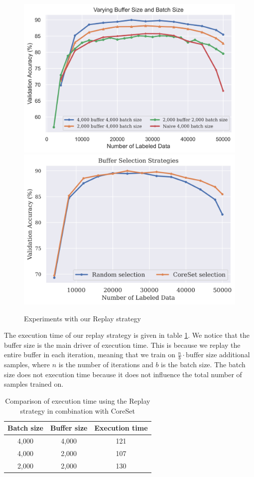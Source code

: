 \begin{figure}[h]
    \centering
    \includegraphics[width=0.45\linewidth]{images/results_CAL/replay_varying_batch_size.png} \hfill
    \includegraphics[width=0.45\linewidth]{images/results_CAL/replay_buffer_selection.png}
    \caption{Experiments with our Replay strategy}
    \label{fig:Evaluation:CAL:Replay}
\end{figure}

The execution time of our replay strategy is given in table \ref{fig:Evaluation:CAL:Replay_Time}. We notice that the buffer size is the main driver of execution time. This is because
we replay the entire buffer in each iteration, meaning that we train on $\frac{n}{b} \cdot \text{buffer size}$ additional samples, where $n$ is the number of iterations and $b$ is
the batch size. The batch size does not execution time because it does not influence the total number of samples trained on. \par

\begin{table}[h]
    \centering
    \begin{tabular}{c | c  c} 
        Batch size & Buffer size & Execution time\\ 
        \hline 
        4,000 & 4,000 & 121 \\
        4,000 & 2,000 & 107 \\
        2,000 & 2,000 & 130 \\
    \end{tabular}
    \caption{Comparison of execution time using the Replay strategy in combination with CoreSet}
    \label{fig:Evaluation:CAL:Replay_Time}
\end{table}


